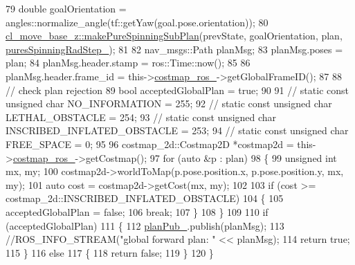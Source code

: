 \begin{DoxyCode}
79     \textcolor{keywordtype}{double} goalOrientation = angles::normalize\_angle(tf::getYaw(goal.pose.orientation));
80     \hyperlink{namespacecl__move__base__z_ac774e138510eb7b5e0015be1f7709e19}{cl\_move\_base\_z::makePureSpinningSubPlan}(prevState, 
      goalOrientation, plan, \hyperlink{classcl__move__base__z_1_1forward__global__planner_1_1ForwardGlobalPlanner_a6aed6f8f6e57a8c5821977814d0b9402}{puresSpinningRadStep\_});
81 
82     nav\_msgs::Path planMsg;
83     planMsg.poses = plan;
84     planMsg.header.stamp = ros::Time::now();
85     
86     planMsg.header.frame\_id = this->\hyperlink{classcl__move__base__z_1_1forward__global__planner_1_1ForwardGlobalPlanner_a711d4a0d92a216eb8cab3b42f18eb795}{costmap\_ros\_}->getGlobalFrameID();
87 
88     \textcolor{comment}{// check plan rejection}
89     \textcolor{keywordtype}{bool} acceptedGlobalPlan = \textcolor{keyword}{true};
90 
91     \textcolor{comment}{// static const unsigned char NO\_INFORMATION = 255;}
92     \textcolor{comment}{// static const unsigned char LETHAL\_OBSTACLE = 254;}
93     \textcolor{comment}{// static const unsigned char INSCRIBED\_INFLATED\_OBSTACLE = 253;}
94     \textcolor{comment}{// static const unsigned char FREE\_SPACE = 0;}
95 
96     costmap\_2d::Costmap2D *costmap2d = this->\hyperlink{classcl__move__base__z_1_1forward__global__planner_1_1ForwardGlobalPlanner_a711d4a0d92a216eb8cab3b42f18eb795}{costmap\_ros\_}->getCostmap();
97     \textcolor{keywordflow}{for} (\textcolor{keyword}{auto} &p : plan)
98     \{
99         \textcolor{keywordtype}{unsigned} \textcolor{keywordtype}{int} mx, my;
100         costmap2d->worldToMap(p.pose.position.x, p.pose.position.y, mx, my);
101         \textcolor{keyword}{auto} cost = costmap2d->getCost(mx, my);
102 
103         \textcolor{keywordflow}{if} (cost >= costmap\_2d::INSCRIBED\_INFLATED\_OBSTACLE)
104         \{
105             acceptedGlobalPlan = \textcolor{keyword}{false};
106             \textcolor{keywordflow}{break};
107         \}
108     \}
109 
110     \textcolor{keywordflow}{if} (acceptedGlobalPlan)
111     \{
112         \hyperlink{classcl__move__base__z_1_1forward__global__planner_1_1ForwardGlobalPlanner_a927dc6a687fac3751033d9736cf8dfcf}{planPub\_}.publish(planMsg);
113         \textcolor{comment}{//ROS\_INFO\_STREAM("global forward plan: " << planMsg);}
114         \textcolor{keywordflow}{return} \textcolor{keyword}{true};
115     \}
116     \textcolor{keywordflow}{else}
117     \{
118         \textcolor{keywordflow}{return} \textcolor{keyword}{false};
119     \}
120 \}
\end{DoxyCode}
